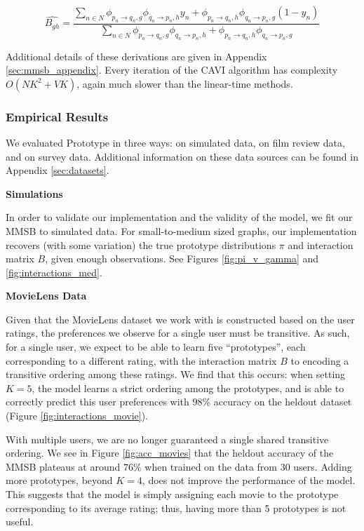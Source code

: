 \[
\hat{B_{gh}} = \frac{
\sum_{n \in N} \phi_{p_n \rightarrow q_n, g} \phi_{q_n \rightarrow p_n, h} y_n + \phi_{p_n \rightarrow q_n, h} \phi_{q_n \rightarrow p_n, g}(1-y_n)
}{
\sum_{n \in N} \phi_{p_n \rightarrow q_n, g} \phi_{q_n \rightarrow p_n, h} + \phi_{p_n \rightarrow q_n, h} \phi_{q_n \rightarrow p_n, g}
}
\]

\bigskip

Additional details of these derivations are given in Appendix \ref{sec:mmsb_appendix}.
Every iteration of the CAVI algorithm has complexity $O(NK^2 + VK)$, again much slower than the linear-time methods.

\subsubsection{Empirical Results}

We evaluated Prototype in three ways: on simulated data, on film review data, and on survey data.
Additional information on these data sources can be found in Appendix \ref{sec:datasets}.

\bigskip

\textbf{Simulations}

\bigskip

In order to validate our implementation and the validity of the model, we fit our MMSB to simulated data.
For small-to-medium sized graphs, our implementation recovers (with some variation) the true prototype distributions $\pi$ and interaction matrix $B$, given enough observations. See Figures \ref{fig:pi_v_gamma} and \ref{fig:interactions_med}.

\bigskip

\textbf{MovieLens Data}

\bigskip

Given that the MovieLens dataset we work with is constructed based on the
user ratings, the preferences we observe for a single user must be transitive.
As such, for a single user, we expect to be able to learn five ``prototypes'', 
each corresponding to a different rating, with the
interaction matrix $B$ to encoding a transitive ordering among these ratings.
We find that this occurs: when setting $K=5$, the model 
learns a strict ordering among the prototypes, and is able to correctly predict 
this user preferences with $98\%$ accuracy on the heldout dataset (Figure \ref{fig:interactions_movie}).  

With multiple users, we are no longer guaranteed a single shared transitive
ordering.
We see in Figure \ref{fig:acc_movies} that the heldout accuracy of the
MMSB plateaus at around $76\%$ when trained on the data from 30 users.
Adding more prototypes, beyond $K=4$, does not improve the
performance of the model. This suggests that the model is simply assigning each
movie to the prototype corresponding to its average rating; thus, having more
than 5 prototypes is not useful.

